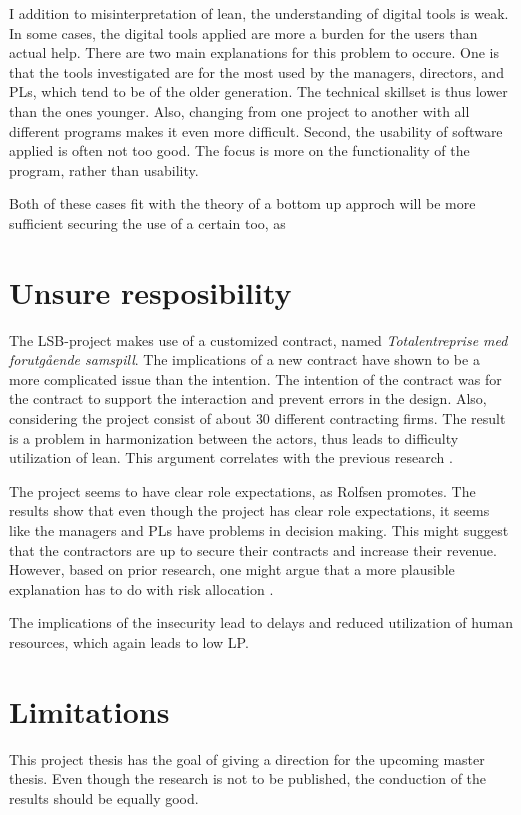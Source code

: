 I addition to misinterpretation of lean, the understanding of digital tools is weak. In some cases, the digital tools applied are more a burden for the users than actual help. There are two main explanations for this problem to occure. One is that the tools investigated are for the most used by the managers, directors, and PLs, which tend to be of the older generation. The technical skillset is thus lower than the ones younger. Also, changing from one project to another with all different programs makes it even more difficult. Second, the usability of software applied is often not too good. The focus is more on the functionality of the program, rather than usability. 

Both of these cases fit with the theory of a bottom up approch will be more sufficient securing the use of a certain too, as 
\section{Unsure resposibility} \label{sec:dis_responsibility}
The LSB-project makes use of a customized contract, named \textit{Totalentreprise med forutgående samspill}. The implications of a new contract have shown to be a more complicated issue than the intention. The intention of the contract was for the contract to support the interaction and prevent errors in the design. Also, considering the project consist of about 30 different contracting firms. The result is a problem in harmonization between the actors, thus leads to difficulty utilization of lean. This argument correlates with the previous research \cite{miller2002harmonization}.

The project seems to have clear role expectations, as Rolfsen promotes\cite{rolfsen}. The results show that even though the project has clear role expectations, it seems like the managers and PLs have problems in decision making. This might suggest that the contractors are up to secure their contracts and increase their revenue. However, based on prior research, one might argue that a more plausible explanation has to do with risk allocation \cite{zaghloul2003construction}. 

The implications of the insecurity lead to delays and reduced utilization of human resources, which again leads to low LP.

\section{Limitations}
This project thesis has the goal of giving a direction for the upcoming master thesis. Even though the research is not to be published, the conduction of the results should be equally good. 

